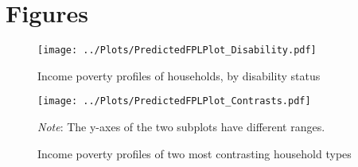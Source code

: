 
\section{Figures}

\begin{figure}[H]
\caption{Income poverty profiles of households, by disability status}
\centering
\texttt{[image: ../Plots/PredictedFPLPlot\_Disability.pdf]}
\label{fig:disability}
\end{figure}

\begin{figure}[H]
\centering
\caption{Income poverty profiles of two most contrasting household types}
\texttt{[image: ../Plots/PredictedFPLPlot\_Contrasts.pdf]}
\label{fig:contrasts}
\begin{minipage}{0.65\textwidth} %
{\footnotesize {\textit{Note}}: The y-axes of the two subplots have different ranges.}
\end{minipage}
\end{figure}





